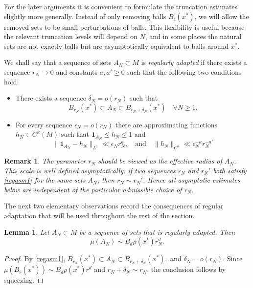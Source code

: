 \documentclass[11pt,twoside,a4paper,reqno]{amsart}
\newtheorem{lemma}[theorem]{Lemma}
\newtheorem{remark}[theorem]{Remark}
\def\one{{\mathbf{1}}}
\begin{document}
For the later arguments it is convenient to formulate the truncation estimates slightly more generally. Instead of only removing balls $B_\epsilon(x^*)$, we will allow the removed sets to be small perturbations of balls. This flexibility is useful because the relevant truncation levels will depend on $N$, and in some places the natural sets are not exactly balls but are asymptotically equivalent to balls around $x^*$.

We shall say that a sequence of sets $A_N\subset M$ is \emph{regularly adapted} if there exists a sequence $r_N\to0$ and constants $a,a'\ge0$ such that the following two conditions hold.

\begin{itemize}
\item[(R1)] There exists a sequence $\delta_N=o(r_N)$ such that
\begin{equation}\label{regasm1}
B_{r_N}(x^*) \subset A_N \subset B_{r_N+\delta_N}(x^*)\quad \forall N\ge1.
\end{equation}
\item[(R2)] For every sequence $\epsilon_N=o(r_N)$ there are approximating functions $h_N\in C^\kappa(M)$ such that $\one_{A_N}\le h_N\le 1$ and
\begin{equation}\label{regasm2}
\|\one_{A_N}-h_N\|_{L^1} \ll \epsilon_N r_N^a, \quad \text{and} \quad \|h_N\|_{C^{\kappa}} \ll \epsilon_N^{-\kappa} r_N^{-a'}
\end{equation}
\end{itemize}

\begin{remark}
The parameter $r_N$ should be viewed as the effective radius of $A_N$. This scale is well defined asymptotically: if two sequences $r_N$ and $r_N'$ both satisfy \eqref{regasm1} for the same sets $A_N$, then $r_N\sim r_N'$. Hence all asymptotic estimates below are independent of the particular admissible choice of $r_N$.
\end{remark}

The next two elementary observations record the consequences of regular adaptation that will be used throughout the rest of the section.

\begin{lemma}\label{regadaptmeasure}
Let $A_N\subset M$ be a sequence of sets that is regularly adapted. Then
$$
\mu(A_N)\sim B_d\rho(x^*)r_N^d.
$$
\end{lemma}

\begin{proof}
By \eqref{regasm1}, $B_{r_N}(x^*)\subset A_N\subset B_{r_N+\delta_N}(x^*),$ and $\delta_N=o(r_N).$
Since $\mu(B_r(x^*))\sim B_d\rho(x^*)r^d$ and $r_N+\delta_N\sim r_N$, the conclusion follows by squeezing.
\end{proof}
\end{document}
